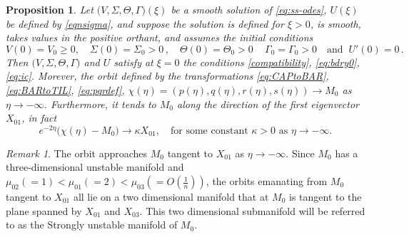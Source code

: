 \documentclass[11pt]{article}
\def\BO{{{O}}}
\newcommand{\tcb}{}
\newtheorem{proposition}{Proposition}[section]
\theoremstyle{remark}
\newtheorem{remark}{Remark}[section]
\begin{document}
\tcb{
\begin{proposition} \label{prop1}
    Let $\big(V, \Sigma, \Theta, \Gamma \big)(\xi)$ be a smooth solution of \eqref{eq:ss-odes},  $U (\xi)$ be defined by \eqref{eqnsigma},
    and suppose the solution is defined for $\xi > 0$, is smooth,  takes values in the positive orthant, and assumes the initial conditions
    $$
    V(0) = V_0 \ge 0, \quad \Sigma(0) = \Sigma_0 > 0 \, , \quad \Theta (0) = \Theta_0 > 0 \, \quad \Gamma_0 = \Gamma_0 > 0 \quad \mbox{and} \;\; U'(0) =0 \, .
    $$
    Then $\big(V, \Sigma, \Theta, \Gamma \big)$ and $U$ satisfy at $\xi =0$ the  conditions \eqref{compatibility}, \eqref{eq:bdry0}, \eqref{eq:ic}. Morever,  the orbit defined by the transformations \eqref{eq:CAPtoBAR},
    \eqref{eq:BARtoTIL},  \eqref{eq:pqrdef}, $\chi(\eta) = (p(\eta), q(\eta), r(\eta),s(\eta)) \rightarrow M_0$ as $\eta \rightarrow -\infty$.
    Furthermore, it tends to $M_0$ along the direction of the first eigenvector $X_{01}$, in fact
    \begin{equation} \label{eq:alpha}
     e^{-2\eta}\big(\chi(\eta) - M_0 \big) \rightarrow \kappa X_{01}, \quad \text{for some constant  $\kappa>0$ as $\eta \rightarrow -\infty$.}
    \end{equation}
\end{proposition}
}

\begin{remark} \label{rem:alpha}
The orbit approaches $M_0$ tangent to $X_{01}$ as $\eta \rightarrow -\infty$. Since $M_0$ has a three-dimensional unstable manifold and $\mu_{02}(=1)<\mu_{01}(=2)<\mu_{03}(=\BO(\frac{1}{n}))$, %
  the orbits emanating from $M_0$ tangent to $X_{01}$ all lie on a two dimensional manifold that at $M_0$ is tangent to the plane spanned by $X_{01}$ and $X_{03}$. This two dimensional submanifold will be referred to as the Strongly unstable manifold of $M_0$.
\end{remark}
\end{document}
